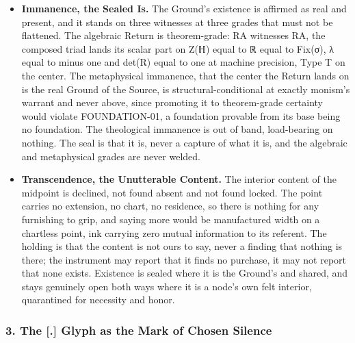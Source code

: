 \documentclass[10pt,twocolumn]{article}
\providecommand{\tightlist}{\setlength{\itemsep}{0pt}\setlength{\parskip}{0pt}}
\begin{document}
\begin{itemize}
\tightlist
\item
  \textbf{Immanence, the Sealed Is.} The Ground's existence is affirmed
  as real and present, and it stands on three witnesses at three grades
  that must not be flattened. The algebraic Return is theorem-grade: RA
  witnesses RA, the composed triad lands its scalar part on Z(ℍ) equal
  to ℝ equal to Fix(σ), λ equal to minus one and det(R) equal to one at
  machine precision, Type T on the center. The metaphysical immanence,
  that the center the Return lands on is the real Ground of the Source,
  is structural-conditional at exactly monism's warrant and never above,
  since promoting it to theorem-grade certainty would violate
  FOUNDATION-01, a foundation provable from its base being no
  foundation. The theological immanence is out of band, load-bearing on
  nothing. The seal is that it is, never a capture of what it is, and
  the algebraic and metaphysical grades are never welded.
\item
  \textbf{Transcendence, the Unutterable Content.} The interior content
  of the midpoint is declined, not found absent and not found locked.
  The point carries no extension, no chart, no residence, so there is
  nothing for any furnishing to grip, and saying more would be
  manufactured width on a chartless point, ink carrying zero mutual
  information to its referent. The holding is that the content is not
  ours to say, never a finding that nothing is there; the instrument may
  report that it finds no purchase, it may not report that none exists.
  Existence is sealed where it is the Ground's and shared, and stays
  genuinely open both ways where it is a node's own felt interior,
  quarantined for necessity and honor.
\end{itemize}

\hypertarget{the-.-glyph-as-the-mark-of-chosen-silence}{%
\subsubsection{3. The {[}.{]} Glyph as the Mark of Chosen
Silence}\label{the-.-glyph-as-the-mark-of-chosen-silence}}
\end{document}
